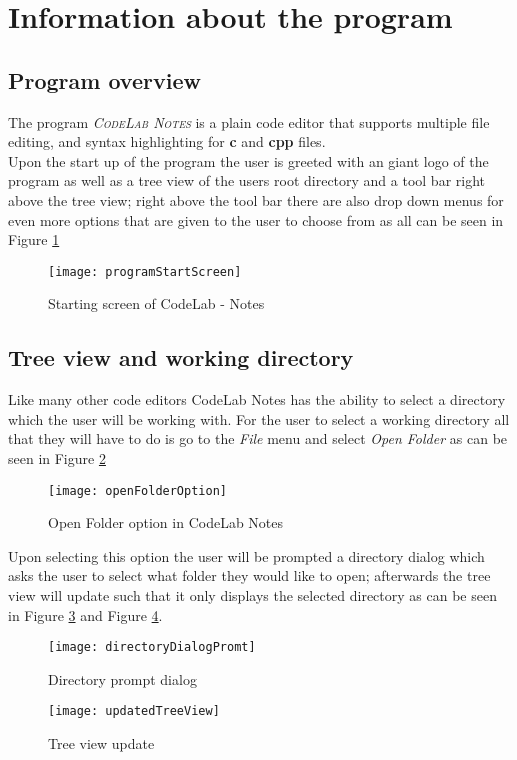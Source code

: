 \documentclass[a4paper, 11pt]{article}
\begin{document}
		\section{Information about the program}
			\subsection{Program overview}
				\noindent The program \emph{\textsc{CodeLab Notes}} is a plain code editor that supports multiple file editing, and syntax highlighting for \textbf{c} and \textbf{cpp} files. \\
			
				\noindent Upon the start up of the program the user is greeted with an giant logo of the program as well as a tree view of the users root directory and a tool bar right above the tree view; right above the tool bar there are also drop down menus for even more options that are given to the user to choose from as all can be seen in Figure \ref{Fig:Program start screen}
				
				\begin{figure}[h]
					\centering
					\texttt{[image: programStartScreen]}
					\caption{Starting screen of CodeLab - Notes}
					\label{Fig:Program start screen}
				\end{figure}
			
			\subsection{Tree view and working directory}
				\noindent Like many other code editors CodeLab Notes has the ability to select a directory which the user will be working with. For the user to select a working directory all that they will have to do is go to the \emph{File} menu and select \emph{Open Folder} as can be seen in Figure \ref{Fig:Open Folder option in CodeLab Notes}
				
				\begin{figure}[h]
					\centering
					\texttt{[image: openFolderOption]}
					\caption{Open Folder option in CodeLab Notes}
					\label{Fig:Open Folder option in CodeLab Notes}
				\end{figure}
			
				\noindent Upon selecting this option the user will be prompted a directory dialog which asks the user to select what folder they would like to open; afterwards the tree view will update such that it only displays the selected directory as can be seen in Figure \ref{Fig:Directory prompt dialog} and Figure \ref{Fig:Tree view update}.
				
				\begin{figure}[h]
					\centering
					\texttt{[image: directoryDialogPromt]}
					\caption{Directory prompt dialog}
					\label{Fig:Directory prompt dialog}
				\end{figure}
				\pagebreak
				
				\begin{figure}[h]
					\centering
					\texttt{[image: updatedTreeView]}
					\caption{Tree view update}
					\label{Fig:Tree view update}
				\end{figure}
\end{document}
